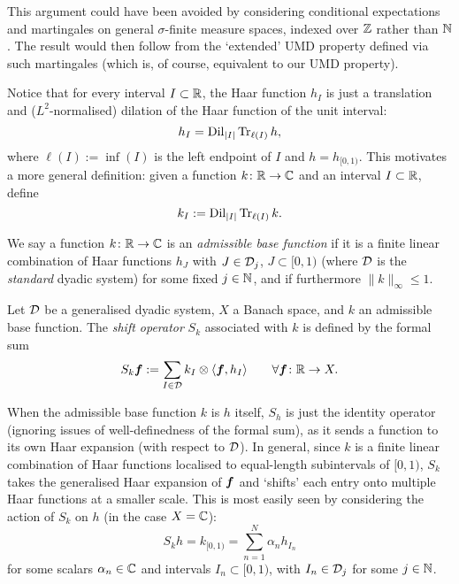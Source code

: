 \begin{rmk}
  This argument could have been avoided by considering conditional expectations and martingales on general $\sigma$-finite measure spaces, indexed over $\mathbb{Z}$ rather than $\mathbb{N}$.
  The result would then follow from the `extended' UMD property defined via such martingales (which is, of course, equivalent to our UMD property).
\end{rmk}


Notice that for every interval $I \subset \mathbb{R}$, the Haar function $h_{I}$ is just a translation and ($L^2$-normalised) dilation of the Haar function of the unit interval:
\begin{equation*}
  h_{I} = \operatorname{Dil}_{|I|} \operatorname{Tr}_{\ell(I)} h,
\end{equation*}
where $\ell(I) := \inf(I)$ is the left endpoint of $I$ and $h = h_{[0,1)}$.
This motivates a more general definition: given a function $k \colon \mathbb{R} \rightarrow \mathbb{C}$ and an interval $I \subset \mathbb{R}$, define
\begin{equation*}
  k_{I} := \operatorname{Dil}_{|I|} \operatorname{Tr}_{\ell(I)} k.
\end{equation*}

\begin{defn}
  We say a function $k \colon \mathbb{R} \rightarrow \mathbb{C}$ is an \emph{admissible base function} if it is a finite linear combination of Haar functions $h_{J}$ with $J \in \mathcal{D}_{j}$, $J \subset [0,1)$ (where $\mathcal{D}$ is the \emph{standard} dyadic system) for some fixed $j \in \mathbb{N}$, and if furthermore $\|k\|_{\infty} \leq 1$.
\end{defn}


\begin{defn}
  Let $\mathcal{D}$ be a generalised dyadic system, $X$ a Banach space, and $k$ an admissible base function.
  The \emph{shift operator} $S_{k}$ associated with $k$ is defined by the formal sum
  \begin{equation*}
    S_{k} \bm{f} := \sum_{I \in \mathcal{D}} k_{I} \otimes \langle \bm{f}, h_{I} \rangle \qquad \forall \bm{f} \colon \mathbb{R} \rightarrow X.
  \end{equation*}
\end{defn}

When the admissible base function $k$ is $h$ itself, $S_{h}$ is just the identity operator (ignoring issues of well-definedness of the formal sum), as it sends a function to its own Haar expansion (with respect to $\mathcal{D}$).
In general, since $k$ is a finite linear combination of Haar functions localised to equal-length subintervals of $[0,1)$, $S_{k}$ takes the generalised Haar expansion of $\bm{f}$ and `shifts' each entry onto multiple Haar functions at a smaller scale.
This is most easily seen by considering the action of $S_{k}$ on $h$ (in the case $X = \mathbb{C}$):
\begin{equation*}
  S_{k} h = k_{[0,1)} = \sum_{n=1}^{N} \alpha_{n} h_{I_{n}}
\end{equation*}
for some scalars $\alpha_{n} \in \mathbb{C}$ and intervals $I_{n} \subset [0,1)$, with $I_{n} \in \mathcal{D}_{j}$ for some $j \in \mathbb{N}$.

